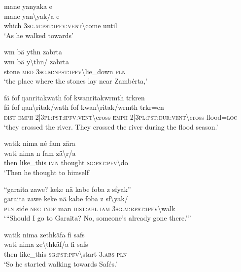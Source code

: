 \ea\label{ex:1:a3666}
mane yanyaka e\\
\gll mane	yan{\textbackslash}yak/a	e\\
     which	3\textsc{sg}.\textsc{m}:\textsc{pst}:\textsc{ipfv}:\textsc{vent}{\textbackslash}come	until\\
\glt `As he walked towards'
\z

\ea\label{ex:1:a3667}
wm bä ythn zabrta\\
\gll wm	bä	y{\textbackslash}thn/	zabrta\\
     stone	\textsc{med}	3\textsc{sg}.\textsc{m}:\textsc{npst}:\textsc{ipfv}{\textbackslash}lie\_down	\textsc{pln}\\
\glt `the place where the stones lay near Zambérta,'
\z

\ea\label{ex:1:a3669}
fä fof ŋanritakwath fof kwanritakwrmth trkren\\
\gll fä	fof	ŋan{\textbackslash}ritak/wath	fof	kwan{\textbackslash}ritak/wrmth	trkr=en\\
     \textsc{dist}	\textsc{emph}	2|3\textsc{pl}:\textsc{pst}:\textsc{ipfv}:\textsc{vent}{\textbackslash}cross	\textsc{emph}	2|3\textsc{pl}:\textsc{pst}:\textsc{dur}:\textsc{vent}{\textbackslash}cross	flood=\textsc{loc}\\
\glt `they crossed the river. They crossed the river during the flood season.'
\z

\ea\label{ex:1:a3672}
watik nima né fam zära\\
\gll wati	nima	n	fam	zä{\textbackslash}r/a\\
     then	like\_this	\textsc{imn}	thought	\textsc{sg}:\textsc{pst}:\textsc{pfv}{\textbackslash}do\\
\glt `Then he thought to himself'
\z

\ea\label{ex:1:a3674}
``garaita zawe? keke nä kabe foba z sfyak''\\
\gll garaita	zawe	keke	nä	kabe	foba	z	sf{\textbackslash}yak/\\
     \textsc{pln}	side	\textsc{neg}	\textsc{indf}	man	\textsc{dist}:\textsc{abl}	\textsc{iam}	3\textsc{sg}.\textsc{m}:\textsc{rpst}:\textsc{ipfv}{\textbackslash}walk\\
\glt `{``}Should I go to Garaita? No, someone's already gone there.'''
\z

\ea\label{ex:1:a3676}
watik nima zethkäfa fi safs\\
\gll wati	nima	ze{\textbackslash}thkäf/a	fi	safs\\
     then	like\_this	\textsc{sg}:\textsc{pst}:\textsc{pfv}{\textbackslash}start	3.\textsc{abs}	\textsc{pln}\\
\glt `So he started walking towards Safés.'
\z


